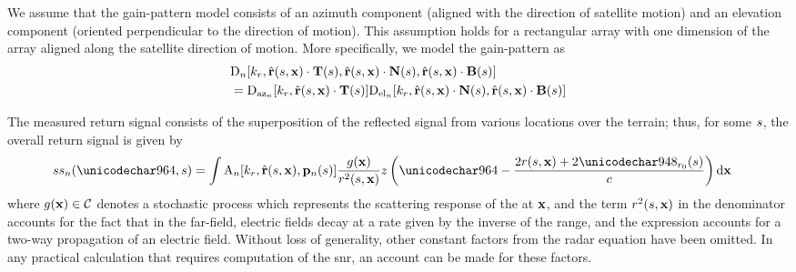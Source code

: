 \par
We assume that the gain-pattern model consists of an azimuth component (aligned with the direction of satellite motion) and an elevation component (oriented perpendicular to the direction of motion). This assumption holds for a rectangular array with one dimension of the array aligned along the satellite direction of motion. More specifically, we model the gain-pattern as
\begin{equation}
\begin{split}
 &\dPattern{\channelIndex}[\kr, \uRangeVectorParm\cdot\vct{T}(\parm), \uRangeVectorParm\cdot\vct{N}(\parm), \uRangeVectorParm\cdot\vct{B}(\parm)]\\ &= \dazPattern{\channelIndex}[\kr, \uRangeVectorParm\cdot\vct{T}(\parm)]\delPattern{\channelIndex}[\kr, \uRangeVectorParm\cdot\vct{N}(\parm), \uRangeVectorParm\cdot\vct{B}(\parm)] 
\end{split} 
\label{eq:antennaDiversityCurveFactored}
\end{equation}
\par
The measured return signal consists of the superposition of the reflected signal from various locations over the terrain; thus, for some $s$, the overall return signal is given by
\begin{equation}
\begin{split}
 \stst{\channelIndex}(\fasttime,\parm)&=\int\pattern{\channelIndex}[\kr, \uRangeVectorParm, \pAntennaParm{\channelIndex}]\frac{\reflectivity(\vct\target)}{\amplitude\range^2(\parm, \targetnoparm)} \pulse\left(\fasttime-\frac{2\amplitude\range(\parm, \targetnoparm)+2\rangeErrorZero(\parm)}{c}\right)\d\vct\target
 \end{split}
\end{equation}
where $g(\mathbf{\mathbf{x}})\in\mathcal{C}$ denotes a stochastic process which represents the scattering response of the  at $\mathbf{\mathbf{x}}$, and the term $\mathnormal{r}^2(s,\mathbf{\mathbf{x}})$ in the denominator accounts for the fact that in the far-field, electric fields decay at a rate given by the inverse of the range, and the expression accounts for a two-way propagation of an electric field. Without loss of generality, other constant factors from the radar equation have been omitted. In any practical calculation that requires computation of the \gls{snr}, an account can be made for these factors.
